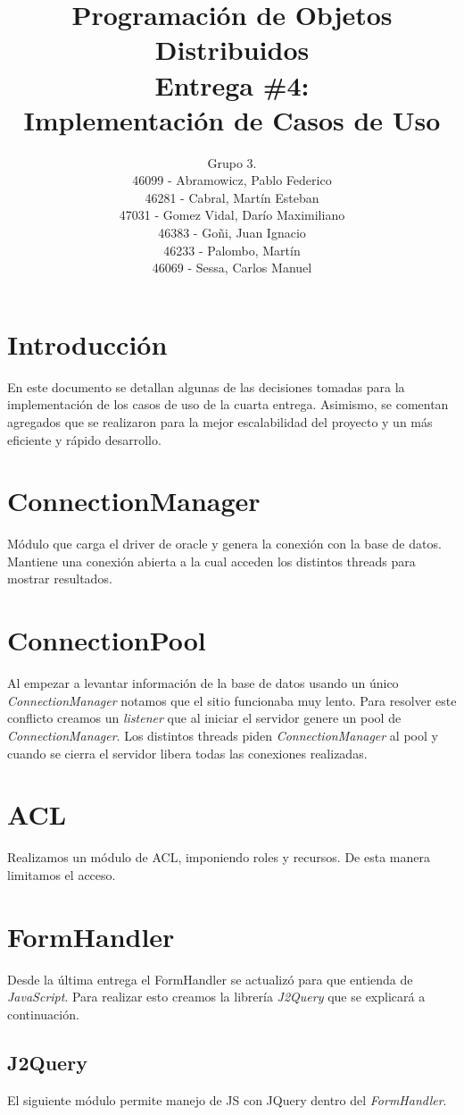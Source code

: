 \documentclass[a4paper,11pt]{article}
\title{
        Programación de Objetos Distribuidos \\
        Entrega \#4: \\
        Implementación de Casos de Uso
    }
\author{
        Grupo 3. \\
        46099 - Abramowicz, Pablo Federico \\
        46281 - Cabral, Martín Esteban \\
        47031 - Gomez Vidal, Darío Maximiliano \\
        46383 - Goñi, Juan Ignacio \\
        46233 - Palombo, Martín \\
        46069 - Sessa, Carlos Manuel
        }
\date{}
\begin{document}
\maketitle
\pagebreak

\section{Introducción}
En este documento se detallan algunas de las decisiones tomadas para la 
implementación de los casos de uso de la cuarta entrega.
Asimismo, se comentan agregados que se realizaron para la mejor
escalabilidad del proyecto y un más eficiente y rápido desarrollo.

\section{ConnectionManager}
Módulo que carga el driver de oracle y genera la conexión con la base de datos.
Mantiene una conexión abierta a la cual acceden los distintos threads para
mostrar resultados.

\section{ConnectionPool}
Al empezar a levantar información de la base de datos usando un único
\textit{ConnectionManager} notamos que el sitio funcionaba muy lento.
Para resolver este conflicto creamos un \textit{listener} que al iniciar el
servidor genere un pool de \textit{ConnectionManager}. Los distintos threads
piden \textit{ConnectionManager} al pool y cuando se cierra el servidor
libera todas las conexiones realizadas.

\section{ACL}
Realizamos un módulo de ACL, imponiendo roles y recursos.
De esta manera limitamos el acceso.

\section{FormHandler}
Desde la última entrega el FormHandler se actualizó para que entienda de
\textit{JavaScript}. Para realizar esto creamos la librería \emph{J2Query}
que se explicará a continuación.

\subsection{J2Query}
El siguiente módulo permite manejo de JS con JQuery dentro del
\textit{FormHandler}.
\end{document}
